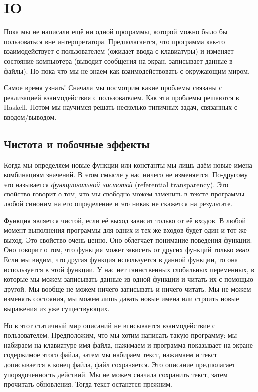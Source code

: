 \setcounter{chapter}{7}
\chapter{IO}

Пока мы не написали ещё ни одной программы, которой
можно было бы пользоваться вне интерпретатора. 
Предполагается, что программа как-то взаимодействует
с пользователем (ожидает ввода с клавиатуры) и 
изменяет состояние компьютера 
(выводит сообщения на экран, записывает данные в файлы).
Но пока что мы не знаем как взаимодействовать 
с окружающим миром. 

Самое время узнать! Сначала мы посмотрим какие
проблемы связаны с реализацией взаимодействия 
с пользователем. Как эти проблемы решаются в
Haskell. Потом мы научимся решать несколько 
типичных задач, связанных с вводом/выводом.

\section{Чистота и побочные эффекты}

Когда мы определяем новые функции или константы
мы лишь даём новые имена комбинациям значений.
В этом смысле у нас ничего не изменяется.
По-другому  это называется \emph{функциональной
чистотой} (referential transparency). Это свойство 
говорит о том, что мы свободно можем заменить 
в тексте программы любой синоним на его определение
и это никак не скажется на результате.

Функция является чистой, если её выход зависит только 
от её входов. В любой момент выполнения программы 
для одних и тех же входов будет один и тот же выход.
Это свойство очень ценно. Оно облегчает понимание
поведения функции. Оно говорит о том, что функция
может зависеть от других функций только \emph{явно}.
Если мы видим, что другая функция используется
в данной функции, то она используется в этой функции. 
У нас нет таинственных глобальных переменных, в которые мы можем
записывать данные из одной функции и читать их с помощью
другой. Мы вообще не можем ничего записывать и ничего
читать. Мы не можем изменять состояния, мы можем лишь давать
новые имена или строить новые выражения из уже существующих. 

Но в этот статичный мир описаний не вписывается
взаимодействие с пользователем. Предположим, что
мы хотим написать такую программу: мы набираем на 
клавиатуре имя файла, нажимаем  и программа 
показывает на экране содержимое этого файла, затем мы набираем текст,
нажимаем  и текст дописывается в конец файла,
файл сохраняется. 
Это описание предполагает упорядоченность действий.
Мы не можем сначала сохранить текст, затем прочитать обновления.
Тогда текст останется прежним. 


